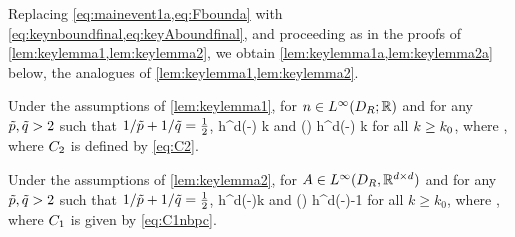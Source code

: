 Replacing \cref{eq:mainevent1a,eq:Fbounda} with \cref{eq:keynboundfinal,eq:keyAboundfinal}, and proceeding as in the proofs of \cref{lem:keylemma1,lem:keylemma2}, we obtain \cref{lem:keylemma1a,lem:keylemma2a} below, the analogues of \cref{lem:keylemma1,lem:keylemma2}.

\label{lem:keylemma1a}
Under the assumptions of \cref{lem:keylemma1}, for $n\in \LiDRRR$ and for any $\tilde{p},\tilde{q} > 2$ such that $1/\tilde{p} + 1/\tilde{q} = \frac{1}{2}$,
\beq\label{eq:keybound12}
\max\set{\NDk{\AmatoI \Mmatn},\NDkI{\Mmatn\AmatoI}} \leq \Cttilde h^{d\mleft(-\half\mright)} k
\eeq
and 
\beq\label{eq:keybound1a2}
\max\set{\Nt{\AmatoI \Mmatn},\Nt{\Mmatn\AmatoI}} \leq \Cttilde\mleft(\frac{\mplus}{\mminus}\mright) h^{d\mleft(-\half\mright)} k
\eeq
for all $k\geq k_{0}$,
where
\beq\label{eq:C2tilde}
\Cttilde\de%
\Cinvptilde\Ct,
\eeq
where $C_{2}$ is defined by \cref{eq:C2}.
\ele

\label{lem:keylemma2a}
Under the assumptions of \cref{lem:keylemma2}, for $A\in L^\infty(D_{R},\mathbb R^{d\times d})$ and for any $\tilde{p},\tilde{q} > 2$ such that $1/\tilde{p} + 1/\tilde{q} = \frac{1}{2}$,
\beq\label{eq:keybound22}
\max\set{\NDk{\AmatoI \SmatA},\NDkI{\SmatA\AmatoI}} \leq \Cotilde h^{d\mleft(-\half\mright)}k 
\eeq
and
\beq\label{eq:keybound2a2}
\max\set{\Nt{\AmatoI \SmatA},\Nt{\SmatA\AmatoI}} \leq \Cotilde\mleft(\frac{\splus}{\mminus}\mright) h^{d\mleft(-\half\mright)-1} 
\eeq
for all $k\geq k_0$, where
\beq\label{eq:C1tildenbpc}
\Cotilde \de \Cinvptilde\Co,
\eeq
where $C_{1}$ is given by \cref{eq:C1nbpc}.
\ele


